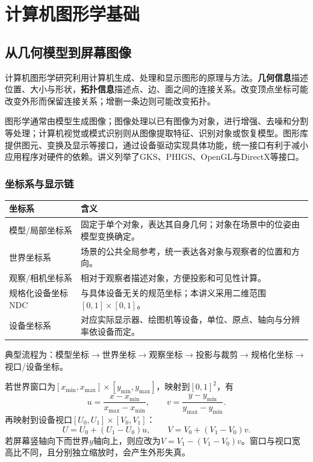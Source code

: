 \chapter{计算机图形学基础}
\label{ch:graphics}

\section{从几何模型到屏幕图像}
计算机图形学研究利用计算机生成、处理和显示图形的原理与方法。\textbf{几何信息}描述位置、大小与形状，\textbf{拓扑信息}描述点、边、面之间的连接关系。改变顶点坐标可能改变外形而保留连接关系；增删一条边则可能改变拓扑。

图形学通常由模型生成图像；图像处理以已有图像为对象，进行增强、去噪和分割等处理；计算机视觉或模式识别则从图像提取特征、识别对象或恢复模型。图形库提供图元、变换及显示等接口，通过设备驱动实现具体功能，统一接口有利于减小应用程序对硬件的依赖。讲义列举了GKS、PHIGS、OpenGL与DirectX等接口。

\subsection{坐标系与显示链}
\begin{center}
\renewcommand{\arraystretch}{1.3}
\begin{tabularx}{\linewidth}{lX}
\toprule
坐标系 & 含义 \\
\midrule
模型/局部坐标系 & 固定于单个对象，表达其自身几何；对象在场景中的位姿由模型变换确定。 \\
世界坐标系 & 场景的公共全局参考，统一表达各对象与观察者的位置和方向。 \\
观察/相机坐标系 & 相对于观察者描述对象，方便投影和可见性计算。 \\
规格化设备坐标NDC & 与具体设备无关的规范坐标；本讲义采用二维范围$[0,1]\times[0,1]$。 \\
设备坐标系 & 对应实际显示器、绘图机等设备，单位、原点、轴向与分辨率依设备而定。 \\
\bottomrule
\end{tabularx}
\end{center}


典型流程为：模型坐标$\to$世界坐标$\to$观察坐标$\to$投影与裁剪$\to$规格化坐标$\to$视口/设备坐标。

若世界窗口为$[x_{\min},x_{\max}]\times[y_{\min},y_{\max}]$，映射到$[0,1]^2$，有
\[
u=\frac{x-x_{\min}}{x_{\max}-x_{\min}},\qquad
v=\frac{y-y_{\min}}{y_{\max}-y_{\min}}.
\]
再映射到设备视口$[U_0,U_1]\times[V_0,V_1]$：
\[
U=U_0+(U_1-U_0)u,\qquad V=V_0+(V_1-V_0)v.
\]
若屏幕竖轴向下而世界$y$轴向上，则应改为$V=V_1-(V_1-V_0)v$。窗口与视口宽高比不同，且分别独立缩放时，会产生外形失真。

